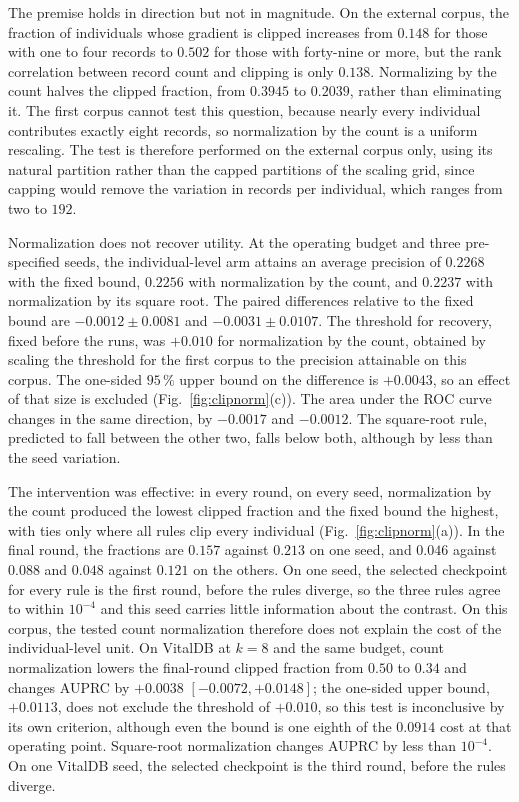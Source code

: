 The premise holds in direction but not in magnitude. On the external corpus,
the fraction of individuals whose gradient is clipped increases from $0.148$
for those with one to four records to $0.502$ for those with forty-nine or
more, but the rank correlation between record count and clipping is only
$0.138$. Normalizing by the count halves the clipped fraction, from $0.3945$ to
$0.2039$, rather than eliminating it. The first corpus cannot test this
question, because nearly every individual contributes exactly eight records, so
normalization by the count is a uniform rescaling. The test is therefore
performed on the external corpus only, using its natural partition rather than
the capped partitions of the scaling grid, since capping would remove the
variation in records per individual, which ranges from two to $192$.

Normalization does not recover utility. At the operating budget and three
pre-specified seeds, the individual-level arm attains an average precision of
$0.2268$ with the fixed bound, $0.2256$ with normalization by the count, and
$0.2237$ with normalization by its square root. The paired differences relative
to the fixed bound are $-0.0012 \pm 0.0081$ and $-0.0031 \pm 0.0107$. The
threshold for recovery, fixed before the runs, was $+0.010$ for normalization by the
count, obtained by scaling the threshold for the first corpus to the precision
attainable on this corpus. The one-sided $95\,\%$ upper bound on the difference
is $+0.0043$, so an effect of that size is excluded (Fig.~\ref{fig:clipnorm}(c)). The area under
the ROC curve changes in the same direction, by $-0.0017$ and $-0.0012$. The
square-root rule, predicted to fall between the other two, falls below both,
although by less than the seed variation.

The intervention was effective: in every round, on every seed,
normalization by the count produced the lowest clipped fraction and the fixed
bound the highest, with ties only where all rules clip every individual
(Fig.~\ref{fig:clipnorm}(a)). In the final round, the fractions are $0.157$ against
$0.213$ on one seed, and $0.046$ against $0.088$ and $0.048$ against $0.121$ on
the others. On one seed, the selected checkpoint for every rule is the first
round, before the rules diverge, so the three rules agree to within $10^{-4}$
and this seed carries little information about the contrast. On this corpus, the tested
count normalization therefore does not explain the cost of the
individual-level unit. On VitalDB at $k = 8$ and the same budget, count normalization lowers the
final-round clipped fraction from $0.50$ to $0.34$ and changes AUPRC by
$+0.0038$ $[-0.0072, +0.0148]$; the one-sided upper bound, $+0.0113$, does not
exclude the threshold of $+0.010$, so this test is inconclusive by its own
criterion, although even the bound is one eighth of the $0.0914$ cost at that
operating point. Square-root normalization changes AUPRC by less than
$10^{-4}$. On one VitalDB seed, the selected checkpoint is the
third round, before the rules diverge.

